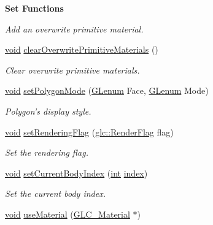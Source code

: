 \begin{Indent}{\bf Set Functions}
\begin{DoxyCompactItemize}
\begin{DoxyCompactList}\small\item\em Add an overwrite primitive material. \end{DoxyCompactList}\item 
\hyperlink{group___u_a_v_objects_plugin_ga444cf2ff3f0ecbe028adce838d373f5c}{void} \hyperlink{class_g_l_c___render_properties_acfc5b8aefc93bbcef43894fd0ae193dc}{clear\-Overwrite\-Primitive\-Materials} ()
\begin{DoxyCompactList}\small\item\em Clear overwrite primitive materials. \end{DoxyCompactList}\item 
\hyperlink{group___u_a_v_objects_plugin_ga444cf2ff3f0ecbe028adce838d373f5c}{void} \hyperlink{class_g_l_c___render_properties_abec451463c332b0a08043ba31eb81a8d}{set\-Polygon\-Mode} (\hyperlink{glext_8h_a508b2dec21679e2e346cad3e0d1969bf}{G\-Lenum} Face, \hyperlink{glext_8h_a508b2dec21679e2e346cad3e0d1969bf}{G\-Lenum} Mode)
\begin{DoxyCompactList}\small\item\em Polygon's display style. \end{DoxyCompactList}\item 
\hyperlink{group___u_a_v_objects_plugin_ga444cf2ff3f0ecbe028adce838d373f5c}{void} \hyperlink{class_g_l_c___render_properties_ac46e892e378d4aab9338a6cd70858144}{set\-Rendering\-Flag} (\hyperlink{namespaceglc_a51a421b53283d5996142222b9baca26c}{glc\-::\-Render\-Flag} flag)
\begin{DoxyCompactList}\small\item\em Set the rendering flag. \end{DoxyCompactList}\item 
\hyperlink{group___u_a_v_objects_plugin_ga444cf2ff3f0ecbe028adce838d373f5c}{void} \hyperlink{class_g_l_c___render_properties_ada85281eabdbd280829cc106b3b92d50}{set\-Current\-Body\-Index} (\hyperlink{ioapi_8h_a787fa3cf048117ba7123753c1e74fcd6}{int} \hyperlink{glext_8h_ab47dd9958bcadea08866b42bf358e95e}{index})
\begin{DoxyCompactList}\small\item\em Set the current body index. \end{DoxyCompactList}\item 
\hyperlink{group___u_a_v_objects_plugin_ga444cf2ff3f0ecbe028adce838d373f5c}{void} \hyperlink{class_g_l_c___render_properties_ac09e6acad0ca7ebbeaf396c9cde73400}{use\-Material} (\hyperlink{class_g_l_c___material}{G\-L\-C\-\_\-\-Material} $\ast$)

\end{DoxyCompactItemize}
\end{Indent}
